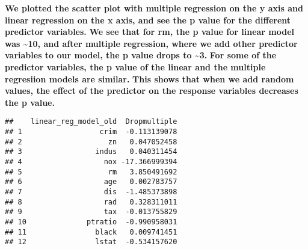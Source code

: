 \documentclass[]{article}
\newenvironment{Shaded}{\begin{snugshade}}{\end{snugshade}}
\newcommand{\CommentTok}[1]{\textcolor[rgb]{0.56,0.35,0.01}{\textit{#1}}}
\newcommand{\DecValTok}[1]{\textcolor[rgb]{0.00,0.00,0.81}{#1}}
\newcommand{\KeywordTok}[1]{\textcolor[rgb]{0.13,0.29,0.53}{\textbf{#1}}}
\newcommand{\NormalTok}[1]{#1}
\newcommand{\OperatorTok}[1]{\textcolor[rgb]{0.81,0.36,0.00}{\textbf{#1}}}
\newcommand{\StringTok}[1]{\textcolor[rgb]{0.31,0.60,0.02}{#1}}
\begin{document}
\textbf{We plotted the scatter plot with multiple regression on the y
axis and linear regression on the x axis, and see the p value for the
different predictor variables.} \textbf{We see that for rm, the p value
for linear model was \textasciitilde{}10, and after multiple regression,
where we add other predictor variables to our model, the p value drops
to \textasciitilde{}3.} \textbf{For some of the predictor variables, the
p value of the linear and the multiple regresiion models are similar.}
\textbf{This shows that when we add random values, the effect of the
predictor on the response variables decreases the p value.}

\begin{Shaded}
\end{Shaded}

\begin{verbatim}
##    linear_reg_model_old  Dropmultiple
## 1                  crim  -0.113139078
## 2                    zn   0.047052458
## 3                 indus   0.040311454
## 4                   nox -17.366999394
## 5                    rm   3.850491692
## 6                   age   0.002783757
## 7                   dis  -1.485373898
## 8                   rad   0.328311011
## 9                   tax  -0.013755829
## 10              ptratio  -0.990958031
## 11                black   0.009741451
## 12                lstat  -0.534157620
\end{verbatim}
\end{document}
